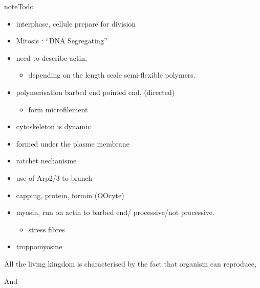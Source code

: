 \documentclass[A4paperpaper,11pt,english]{sphinxmanual}
\begin{document}
\begin{notice}{note}{Todo}
\begin{itemize}
\begin{itemize}
\item {} 
interphase, cellule prepare for division

\item {} 
Mitosis : ``DNA Segregating''

\item {} 
need to describe actin,
\begin{itemize}
\item {} 
depending on the length scale semi-flexible polymers.

\end{itemize}

\item {} 
polymerisation barbed end pointed end, (directed)
\begin{itemize}
\item {} 
form microfilement

\end{itemize}

\item {} 
cytoskeleton is dynamic

\item {} 
formed under the plasme membrane

\item {} 
ratchet nechanisme

\item {} 
use of Arp2/3 to branch

\item {} 
capping, protein,  formin (OOcyte)

\item {} 
myosin, run on actin to barbed end/ processive/not processive.
\begin{itemize}
\item {} 
stress fibres

\end{itemize}

\item {} 
troppomyosine

\end{itemize}

\end{itemize}

All the living kingdom is characterised by the fact that organism can reproduce,
\end{notice}

And
\end{document}
